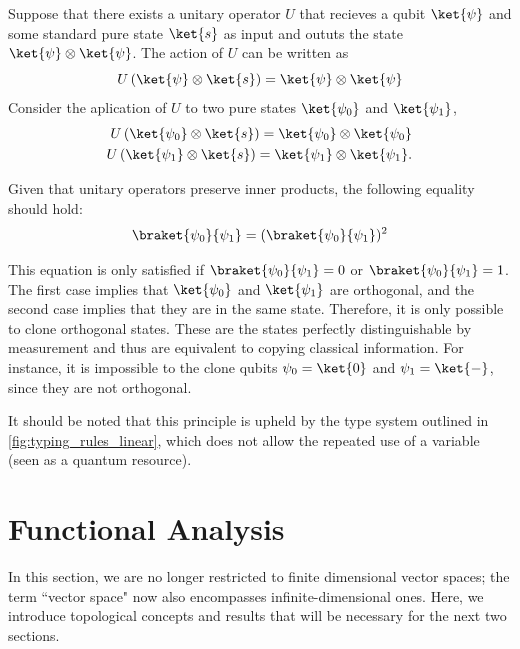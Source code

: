 Suppose that there exists a unitary operator $U$ that recieves a qubit $\ket{\psi}$ and some standard pure state $\ket{s}$ as input and oututs the state $\ket{\psi} \otimes \ket{\psi}$. The action of $U$ can be written as
\begin{equation*}
  U \left(\ket{\psi} \otimes \ket{s} \right) = \ket{\psi} \otimes \ket{\psi}
\end{equation*}
Consider the aplication of $U$ to two pure states $\ket{\psi_0}$ and $\ket{\psi_1}$,
\begin{align*}
  U \left(\ket{\psi_0} \otimes \ket{s} \right) = \ket{\psi_0} \otimes \ket{\psi_0} \\
  U \left(\ket{\psi_1} \otimes \ket{s} \right) = \ket{\psi_1} \otimes \ket{\psi_1}.
\end{align*}

Given that unitary operators preserve inner products, the following equality should hold:
\begin{equation*}
  \braket{\psi_0}{\psi_1} = ( \braket{\psi_0}{\psi_1})^{2}
\end{equation*}

This equation is only satisfied if $\braket{\psi_0}{\psi_1} = 0$ or $\braket{\psi_0}{\psi_1} = 1$. The first case implies that $\ket{\psi_0}$ and $\ket{\psi_1}$ are orthogonal, and the second case implies that they are in the same state. Therefore, it is only possible to clone orthogonal states. These are the states perfectly distinguishable by measurement and thus are equivalent to copying classical information. For instance, it is impossible to the clone qubits $\psi_0 = \ket{0}$ and $\psi_1 = \ket{-}$, since they are not orthogonal.

It should be noted that this principle is upheld by the type system outlined in \autoref{fig:typing_rules_linear}, which does not allow the repeated use of a variable (seen as a quantum resource).




\section{Functional Analysis}


In this section, we are no longer restricted to finite dimensional vector spaces; the term ``vector space" now also encompasses infinite-dimensional ones. Here, we introduce topological concepts and results that will be necessary for the next two sections.


